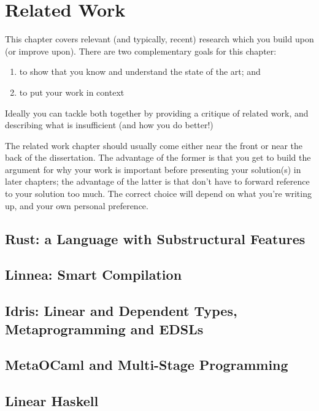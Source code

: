 \chapter{Related Work}

\begin{guidance}

    This chapter covers relevant (and typically, recent) research
    which you build upon (or improve upon). There are two complementary
    goals for this chapter:
    \begin{enumerate}
      \item to show that you know and understand the state of the art; and
      \item to put your work in context
    \end{enumerate}

    Ideally you can tackle both together by providing a critique of
    related work, and describing what is insufficient (and how you do
    better!)

    The related work chapter should usually come either near the front or
    near the back of the dissertation. The advantage of the former is that
    you get to build the argument for why your work is important before
    presenting your solution(s) in later chapters; the advantage of the
    latter is that don't have to forward reference to your solution too
    much. The correct choice will depend on what you're writing up, and
    your own personal preference.

\end{guidance}

%

\section{Rust: a Language with Substructural Features}

\section{Linnea: Smart Compilation}

\section{Idris: Linear and Dependent Types, Metaprogramming and EDSLs}

\section{MetaOCaml and Multi-Stage Programming}

\section{Linear Haskell}
